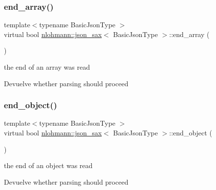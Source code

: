 \subsubsection{\texorpdfstring{end\+\_\+array()}{end\_array()}}
{\footnotesize\ttfamily template$<$typename Basic\+Json\+Type $>$ \\
virtual bool \mbox{\hyperlink{structnlohmann_1_1json__sax}{nlohmann\+::json\+\_\+sax}}$<$ Basic\+Json\+Type $>$\+::end\+\_\+array (\begin{DoxyParamCaption}{ }\end{DoxyParamCaption})\hspace{0.3cm}{\ttfamily [pure virtual]}}



the end of an array was read 

\begin{DoxyReturn}{Devuelve}
whether parsing should proceed 
\end{DoxyReturn}
\mbox{\label{structnlohmann_1_1json__sax_ad0c722d53ff97be700ccf6a9468bd456}} 
\subsubsection{\texorpdfstring{end\+\_\+object()}{end\_object()}}
{\footnotesize\ttfamily template$<$typename Basic\+Json\+Type $>$ \\
virtual bool \mbox{\hyperlink{structnlohmann_1_1json__sax}{nlohmann\+::json\+\_\+sax}}$<$ Basic\+Json\+Type $>$\+::end\+\_\+object (\begin{DoxyParamCaption}{ }\end{DoxyParamCaption})\hspace{0.3cm}{\ttfamily [pure virtual]}}



the end of an object was read 

\begin{DoxyReturn}{Devuelve}
whether parsing should proceed 
\end{DoxyReturn}
\mbox{\label{structnlohmann_1_1json__sax_a2e0c7ecd80b18d18a8cc76f71cfc2028}} 
